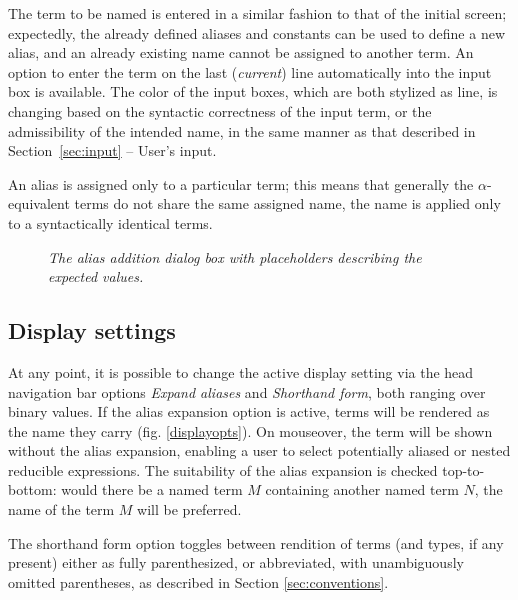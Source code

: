 \documentclass[table, a4paper, 10pt]{book}
\begin{document}
The term to be named is entered in a similar fashion to that of the initial screen;
expectedly, the already defined aliases and constants can be used to define a new alias,
and an already existing name cannot be assigned to another term.
An option to enter the term on the last (\textit{current}) line automatically into the 
input box is available. The color of the input boxes, which are both stylized as line, is changing
based on the syntactic correctness of the input term, or the admissibility of the intended name,
in the same manner as that described in Section~\ref{sec:input} -- User's input.

An alias is assigned only to a particular term; this means that
generally the $\alpha$-equivalent terms do not share the same assigned name,
the name is applied only to a syntactically identical terms.

\begin{figure}[H]\centering
{}
\caption{\textit{The alias addition dialog box with placeholders describing the expected values.}}\label{aliaswindow}
\end{figure}

\subsection{Display settings}
At any point, it is possible to change the active display setting via the 
head navigation bar options \textit{Expand aliases} and \textit{Shorthand form},
both ranging over binary values. If the alias expansion option is active,
terms will be rendered as the name they carry (fig. \ref{displayopts}). On mouseover, the term will
be shown without the alias expansion, enabling a user to select potentially
aliased or nested reducible expressions. The suitability of the alias expansion is
checked top-to-bottom: would there be a named term $M$ containing another named term $N$,
the name of the term $M$ will be preferred.

The shorthand form option toggles between rendition of terms (and types, if any present)
either as fully parenthesized, or abbreviated,
with unambiguously omitted parentheses, as described in Section \ref{sec:conventions}.
\end{document}

